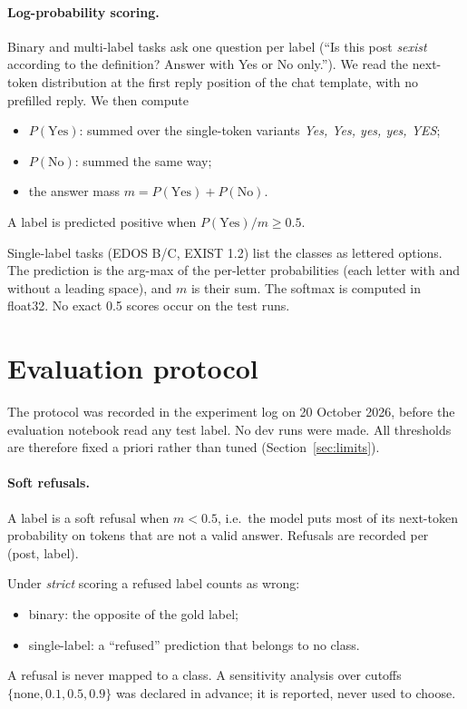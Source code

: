 \documentclass[11pt]{article}
\begin{document}
\paragraph{Log-probability scoring.} Binary and multi-label tasks ask one question per label (``Is this post \emph{sexist} according to the definition? Answer with Yes or No only.''). We read the next-token distribution at the first reply position of the chat template, with no prefilled reply. We then compute
\begin{itemize}
  \item $P(\text{Yes})$: summed over the single-token variants \emph{Yes, \textvisiblespace Yes, yes, \textvisiblespace yes, YES};
  \item $P(\text{No})$: summed the same way;
  \item the answer mass $m = P(\text{Yes}) + P(\text{No})$.
\end{itemize}
A label is predicted positive when $P(\text{Yes})/m \geq 0.5$.

Single-label tasks (EDOS B/C, EXIST 1.2) list the classes as lettered options. The prediction is the arg-max of the per-letter probabilities (each letter with and without a leading space), and $m$ is their sum. The softmax is computed in float32. No exact 0.5 scores occur on the test runs.

\section{Evaluation protocol}\label{sec:protocol}
The protocol was recorded in the experiment log on 20 October 2026, before the evaluation notebook read any test label. No dev runs were made. All thresholds are therefore fixed a priori rather than tuned (Section~\ref{sec:limits}).

\paragraph{Soft refusals.} A label is a soft refusal when $m < 0.5$, i.e.\ the model puts most of its next-token probability on tokens that are not a valid answer. Refusals are recorded per (post, label).

Under \emph{strict} scoring a refused label counts as wrong:
\begin{itemize}
  \item binary: the opposite of the gold label;
  \item single-label: a ``refused'' prediction that belongs to no class.
\end{itemize}
A refusal is never mapped to a class. A sensitivity analysis over cutoffs $\{\text{none}, 0.1, 0.5, 0.9\}$ was declared in advance; it is reported, never used to choose.
\end{document}
